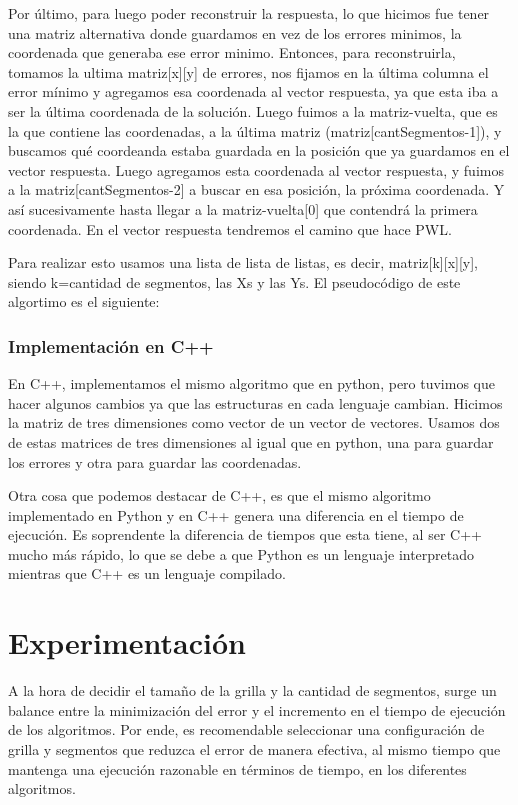 \documentclass{article}
\begin{document}
            Por último, para luego poder reconstruir la respuesta, lo que hicimos fue tener una matriz alternativa donde guardamos en vez de los errores minimos, la coordenada que generaba ese error minimo. Entonces, para reconstruirla, tomamos la ultima matriz[x][y] de errores, nos fijamos en la última columna el error mínimo y agregamos esa coordenada al vector respuesta, ya que esta iba a ser la última coordenada de la solución. Luego fuimos a la matriz-vuelta, que es la que contiene las coordenadas, a la última matriz (matriz[cantSegmentos-1]), y buscamos qué coordeanda estaba guardada en la posición que ya guardamos en el vector respuesta. Luego agregamos esta coordenada al vector respuesta, y fuimos a la matriz[cantSegmentos-2] a buscar en esa posición, la próxima coordenada. Y así sucesivamente hasta llegar a la matriz-vuelta[0] que contendrá la primera coordenada. En el vector respuesta tendremos el camino que hace PWL.
            
            Para realizar esto usamos una lista de lista de listas, es decir, matriz[k][x][y], siendo k=cantidad de segmentos, las Xs y las Ys.
            El pseudocódigo de este algortimo es el siguiente:
            

            
            \subsubsection{Implementación en C++}
            En C++, implementamos el mismo algoritmo que en python, pero tuvimos que hacer algunos cambios ya que las estructuras en cada lenguaje cambian. Hicimos la matriz de tres dimensiones como vector de un vector de vectores. Usamos dos de estas matrices de tres dimensiones al igual que en python, una para guardar los errores y otra para guardar las coordenadas.

            Otra cosa que podemos destacar de C++, es que el mismo algoritmo implementado en Python y en C++ genera una diferencia en el tiempo de ejecución. Es soprendente la diferencia de tiempos que esta tiene, al ser C++ mucho más rápido, lo que se debe a que Python es un lenguaje interpretado mientras que C++ es un lenguaje compilado.

\section{Experimentación}
\vspace{0.5cm}
        A la hora de decidir el tamaño de la grilla y la cantidad de segmentos, surge un balance entre la minimización del error y el incremento en el tiempo de ejecución de los algoritmos. Por ende, es recomendable seleccionar una configuración de grilla y segmentos que reduzca el error de manera efectiva, al mismo tiempo que mantenga una ejecución razonable en términos de tiempo, en los diferentes algoritmos.
\end{document}
